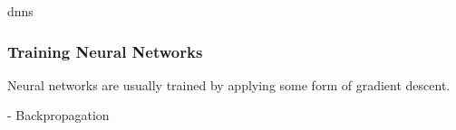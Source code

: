 




\glspl{dnn}




%
%
%


%
%

\subsubsection{Training Neural Networks}
Neural networks are usually trained by applying some form of gradient descent.

- Backpropagation


